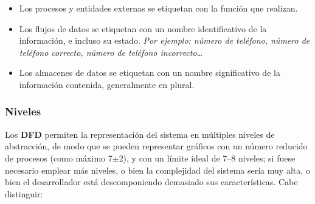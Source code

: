 \begin{itemize}
    \item Los procesos y entidades externas se etiquetan con la función que realizan.
    \item Los flujos de datos se etiquetan con un nombre identificativo de la información, e incluso su estado. \textit{Por ejemplo: número de teléfono, número de teléfono correcto, número de teléfono incorrecto\ldots}
    \item Los almacenes de datos se etiquetan con un nombre significativo de la información contenida, generalmente en plural.
\end{itemize}

\subsubsection{Niveles}

Los \textbf{DFD} permiten la representación del sistema en múltiples niveles de abstracción, de modo que se pueden representar gráficos con un número reducido de procesos (como máximo 7$\pm$2), y con un límite ideal de 7--8 niveles; si fuese necesario emplear más niveles, o bien la complejidad del sistema sería muy alta, o bien el desarrollador está descomponiendo demasiado sus características. Cabe distinguir:

